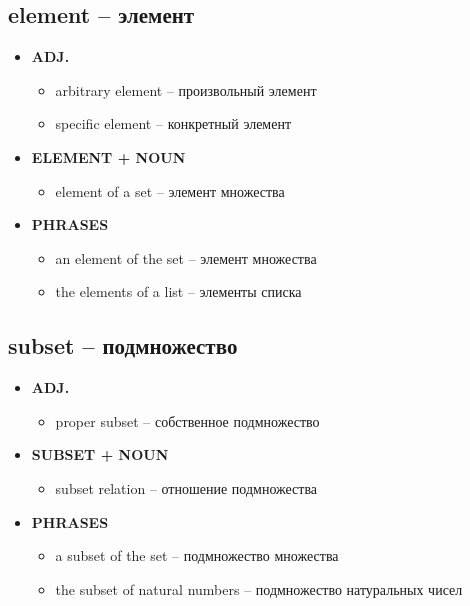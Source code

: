 \documentclass[a4paper, 10pt]{article}
\theoremstyle{definition}
\theoremstyle{plain}
\theoremstyle{remark}
\begin{document}
\subsection{element – элемент}

\begin{itemize}
    \item \textbf{ADJ.}
    \begin{itemize}
        \item arbitrary element – произвольный элемент
        \item specific element – конкретный элемент
    \end{itemize}
    
    \item \textbf{ELEMENT + NOUN}
    \begin{itemize}
        \item element of a set – элемент множества
    \end{itemize}
    
    \item \textbf{PHRASES}
    \begin{itemize}
        \item an element of the set – элемент множества
        \item the elements of a list – элементы списка
    \end{itemize}
\end{itemize}

\subsection{subset – подмножество}

\begin{itemize}
    \item \textbf{ADJ.}
    \begin{itemize}
        \item proper subset – собственное подмножество
    \end{itemize}
    
    \item \textbf{SUBSET + NOUN}
    \begin{itemize}
        \item subset relation – отношение подмножества
    \end{itemize}
    
    \item \textbf{PHRASES}
    \begin{itemize}
        \item a subset of the set – подмножество множества
        \item the subset of natural numbers – подмножество натуральных чисел
    \end{itemize}
\end{itemize}
\end{document}
